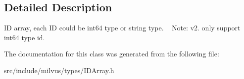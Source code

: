 \subsection{Detailed Description}
ID array, each ID could be int64 type or string type. ~\newline
Note\+: v2. only support int64 type id. 

The documentation for this class was generated from the following file\+:\begin{DoxyCompactItemize}
\item 
src/include/milvus/types/I\+D\+Array.\+h\end{DoxyCompactItemize}
